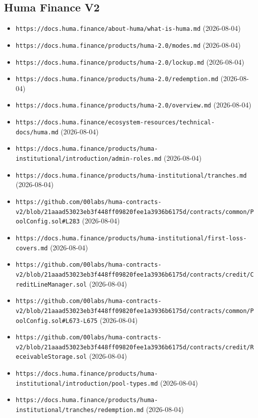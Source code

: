 \subsection*{Huma Finance V2}
\begin{itemize}\setlength{\itemsep}{0pt}\small
\item \texttt{https://docs.huma.finance/about-huma/what-is-huma.md} (2026-08-04)
\item \texttt{https://docs.huma.finance/products/huma-2.0/modes.md} (2026-08-04)
\item \texttt{https://docs.huma.finance/products/huma-2.0/lockup.md} (2026-08-04)
\item \texttt{https://docs.huma.finance/products/huma-2.0/redemption.md} (2026-08-04)
\item \texttt{https://docs.huma.finance/products/huma-2.0/overview.md} (2026-08-04)
\item \texttt{https://docs.huma.finance/ecosystem-resources/technical-docs/huma.md} (2026-08-04)
\item \texttt{https://docs.huma.finance/products/huma-institutional/introduction/admin-roles.md} (2026-08-04)
\item \texttt{https://docs.huma.finance/products/huma-institutional/tranches.md} (2026-08-04)
\item \texttt{https://github.com/00labs/huma-contracts-v2/blob/21aaad53023eb3f448ff09820fee1a3936b6175d/contracts/common/PoolConfig.sol\#L283} (2026-08-04)
\item \texttt{https://docs.huma.finance/products/huma-institutional/first-loss-covers.md} (2026-08-04)
\item \texttt{https://github.com/00labs/huma-contracts-v2/blob/21aaad53023eb3f448ff09820fee1a3936b6175d/contracts/credit/CreditLineManager.sol} (2026-08-04)
\item \texttt{https://github.com/00labs/huma-contracts-v2/blob/21aaad53023eb3f448ff09820fee1a3936b6175d/contracts/common/PoolConfig.sol\#L673-L675} (2026-08-04)
\item \texttt{https://github.com/00labs/huma-contracts-v2/blob/21aaad53023eb3f448ff09820fee1a3936b6175d/contracts/credit/ReceivableStorage.sol} (2026-08-04)
\item \texttt{https://docs.huma.finance/products/huma-institutional/introduction/pool-types.md} (2026-08-04)
\item \texttt{https://docs.huma.finance/products/huma-institutional/tranches/redemption.md} (2026-08-04)
\end{itemize}


